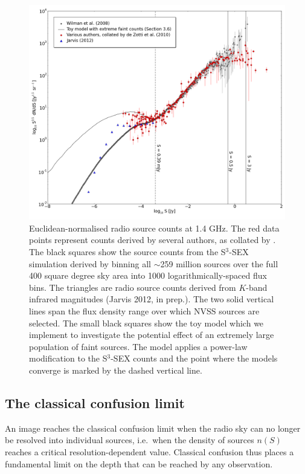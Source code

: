 \documentclass{aa}
\begin{document}
\begin{figure}
\centering
\includegraphics[width = \columnwidth]{1400_source_counts_1000}
\caption{Euclidean-normalised radio source counts at 1.4 GHz. The red data points represent counts derived by several authors, as collated by \citet{deZotti-surveys}. The black squares show the source counts from the S$^{3}$-SEX simulation derived by binning all $\sim$259 million sources over the full 400 square degree sky area into 1000 logarithmically-spaced flux bins. The triangles are radio source counts derived from $K$-band infrared magnitudes (Jarvis 2012, in prep.). The two solid vertical lines span the flux density range over which NVSS sources are selected. The small black squares show the toy model which we implement to investigate the potential effect of an extremely large population of faint sources. The model applies a power-law modification to the S$^{3}$-SEX counts and the point where the models converge is marked by the dashed vertical line.  \label{fig:source_counts}}
\end{figure}

\subsection{The classical confusion limit}

An image reaches the classical confusion limit when the radio sky can no longer be resolved into individual sources, i.e.~when the density of sources $n(S)$ reaches a critical resolution-dependent value. Classical confusion thus places a fundamental limit on the depth that can be reached by any observation.
\end{document}
